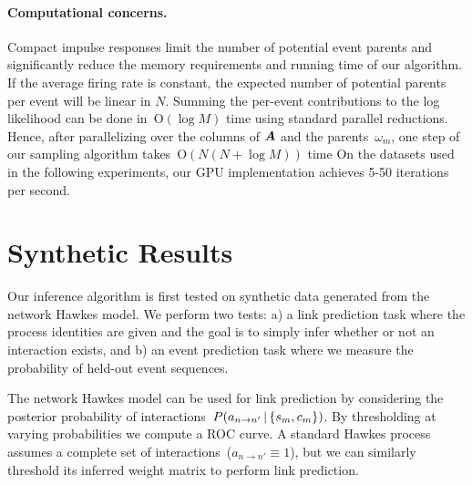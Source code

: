 \paragraph{Computational concerns.}
Compact impulse responses limit the number of potential event parents
and significantly reduce the memory requirements and running time of
our algorithm. If the average firing rate is constant, the expected
number of potential parents per event will be linear in $N$. Summing
the per-event contributions to the log likelihood can be done
in~${\mathrm{O}(\log M)}$ time using standard parallel
reductions. Hence, after parallelizing over the columns of $\boldsymbol{A}$ and
the parents~$\omega_m$, one step of our sampling algorithm
takes~${\mathrm{O}(N(N+\log M))}$ time
On the datasets used in the following experiments, our GPU
implementation
achieves 5-50 iterations per second.


\section{Synthetic Results}
\label{sec:synth}
Our inference algorithm is first tested on synthetic data generated
from the network Hawkes model. We perform two tests: a) a link
prediction task where the process identities are given and the goal is
to simply infer whether or not an interaction exists, and b) an event
prediction task where we measure the probability of held-out event
sequences.

The network Hawkes model can be used for link prediction by
considering the posterior probability of interactions~$P(a_{n \to
  n'}\,|\, \{s_m,c_m\})$. By thresholding at varying probabilities we
compute a ROC curve. A standard Hawkes process assumes a complete set
of interactions~($a_{n \to n'}\equiv 1$), but we can similarly threshold
its inferred weight matrix to perform link prediction.

